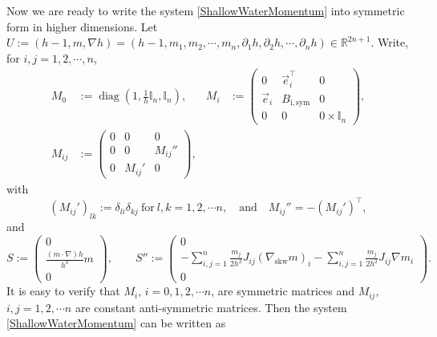 \documentclass[reqno,11pt]{amsart}
\DeclareMathOperator{\diag}{diag}
\theoremstyle{plain}
\theoremstyle{definition}
\numberwithin{equation}{section}
\begin{document}
Now we are ready to write the system \eqref{ShallowWaterMomentum} into symmetric form in higher dimensions. Let $ U := (h-1, m, \nabla h) = (h-1, m_1, m_2, \cdots, m_n, \partial_1 h, \partial_2 h, \cdots , \partial_n h) \in \mathbb R^{2n+1} $. Write, for $ i,j = 1,2,\cdots , n $,  
\begin{equation}
    \label{def:coefficient}
    \begin{aligned}
        M_0 &:= \diag (1, \frac{1}{h}\mathbb I_n, \mathbb I_n), &
        M_i &:= \begin{pmatrix}
            0 & \vec e_i^\top & 0\\ 
            \vec e_i & B_\mathrm{i,sym} & 0 \\
            0 & 0 & 0 \times \mathbb I_n
        \end{pmatrix}, \\
        M_{ij} &:= \begin{pmatrix}
            0 & 0 & 0 \\
            0 & 0 & M_{ij}'' \\
            0 & M_{ij}' & 0
        \end{pmatrix}, & & %
    \end{aligned}
\end{equation}
with 
\begin{equation}
    \label{def:m-ij'''}
    (M_{ij}')_{lk} := \delta_{li}\delta_{kj} \ \text{for}\ l, k = 1,2,\cdots n, \quad \text{and}  \quad M_{ij}'' = - (M_{ij}')^\top,
\end{equation}
and 
\begin{equation}
    \label{def:source}
    S := \begin{pmatrix}
    0 \\ \frac{(m\cdot\nabla)h}{h^3}  m \\ 0
    \end{pmatrix}, \qquad 
    S'':= \begin{pmatrix}
        0 \\ 
        - \sum_{i,j=1}^n \frac{m_j}{2h^2} J_{ij}  (\nabla_\mathrm{skw} m)_i - \sum_{i,j=1}^n \frac{m_j}{2h^2} J_{ij} \nabla m_i  \\
        0
    \end{pmatrix}.
\end{equation}
It is easy to verify that $ M_i $, $ i = 0,1,2,\cdots n $, are symmetric matrices and $ M_{ij} $, $ i,j = 1,2,\cdots n $ are constant anti-symmetric matrices. Then the system \eqref{ShallowWaterMomentum} can be written as
\end{document}
